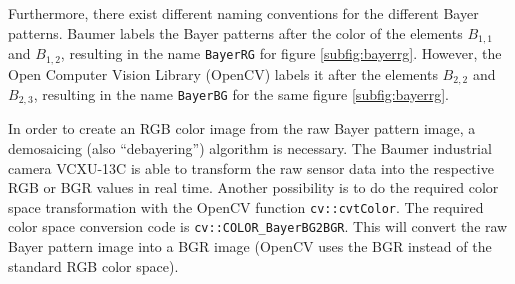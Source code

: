 Furthermore, there exist different naming conventions for the different Bayer patterns.
Baumer labels the Bayer patterns after the color of the elements $B_{1,1}$ and $B_{1,2}$, resulting in the name \texttt{BayerRG} for figure \ref{subfig:bayerrg}.
However, the Open Computer Vision Library (OpenCV) labels it after the elements $B_{2,2}$ and $B_{2,3}$, resulting in the name \texttt{BayerBG} for the same figure \ref{subfig:bayerrg}.

In order to create an RGB color image from the raw Bayer pattern image, a demosaicing (also ``debayering'') algorithm is necessary.
The Baumer industrial camera VCXU-13C is able to transform the raw sensor data into the respective RGB or BGR values in real time.
Another possibility is to do the required color space transformation with the OpenCV function \texttt{cv::cvtColor}.
The required color space conversion code is \texttt{cv::COLOR\_BayerBG2BGR}.
This will convert the raw Bayer pattern image into a BGR image (OpenCV uses the BGR instead of the standard RGB color space).
